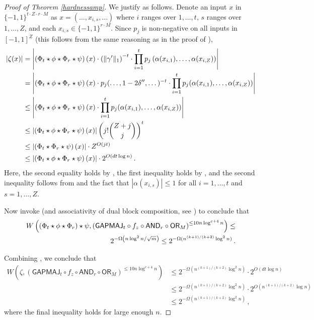 \documentclass{toc}
\newcommand{\OR}{\mathsf{ OR}}
\newcommand{\GAPMAJ}{\mathsf{GAPMAJ}}
\newcommand{\bits}{\{-1,1\}}
\newcommand{\ls}{\star}
\newcommand{\AND}{\mathsf{AND}}
\begin{document}
\begin{proof}[Proof of Theorem \ref{hardnessamp}]
	We justify  as follows. Denote
	an input $x$ in $\bits^{t \cdot Z \cdot r \cdot M}$ as $x=(\dots, x_{i, s}, \dots)$ 
	where $i$ ranges over $1, \dots, t$, $s$ ranges over $1, \dots, Z$,
	and each $x_{i,s} \in \bits^{r \cdot M}$.  Since $p_j$ is non-negative on all inputs in $[-1, 1]^Z$ (this follows from the same reasoning as in the proof of ),
	\begin{align}
	\left|\zeta(x)\right| &= \left|\left(\Phi_t \ls \phi \ls \Phi_r \ls \psi\right)(x) \cdot \left(\|\gamma'\|_1\right)^{-t}  \cdot \prod_{i=1}^{t} p_j\left(\alpha(x_{i, 1}), \dots, \alpha(x_{i, Z})\right) \right| \notag \\
	\notag &=  \left|\left(\Phi_t \ls \phi \ls \Phi_r \ls \psi\right)(x) \cdot p_j(\dots, 1-2\delta'', \dots)^{-t} \cdot \prod_{i=1}^{t} p_j(\alpha(x_{i, 1}), \dots, \alpha(x_{i, Z}))\right|\\
	\notag &\leq  \left|\left(\Phi_t \ls \phi \ls \Phi_r \ls \psi\right)(x) \cdot \prod_{i=1}^{t} p_j(\alpha(x_{i, 1}), \dots, \alpha(x_{i, Z}))\right|\\
	&\leq \left| \left(\Phi_t \ls \phi \ls \Phi_r \ls \psi\right)(x) \right| \left(j! {Z+j \choose j}\right)^t \notag \\
	&\leq \left| \left(\Phi_t \ls \Phi_r \ls \psi\right)(x) \right| \cdot Z^{O(jt)} \notag\\
	&\leq 
	\left| \left(\Phi_t \ls \phi \ls \Phi_r \ls \psi\right)(x) \right| \cdot 2^{O(d t \log n)}\,. \label{fineq} 
	\end{align}
	Here, the second equality holds by , the first inequality holds by , and the second inequality follows from  and the fact that $|\alpha(x_{i, s})| \leq 1$ for all $i=1, \dots, t$ and $s=1, \dots, Z$. 
	
	Now invoke  (and associativity of dual block composition, see 
	 ) to conclude that 
	\begin{align} \label{reallyfineq} W\left( \left(\Phi_t \ls \phi \ls \Phi_r\right) \ls \psi, \left(\GAPMAJ_t \circ f_z \circ \AND_r \circ \OR_M\right)^{\leq 10 n \log^{c+4} n}\right) \notag \leq\\
	2^{-\Omega\left(n \log^2 n / \sqrt{m}\right)} \leq 2^{-\Omega(n^{(k+1)/(k+2)} \log^2 n)}\,.\end{align}
	
	Combining  , we conclude that
	\begin{align*} W\left( \zeta, \left(\GAPMAJ_t \circ f_z \circ \AND_r \circ \OR_M\right)^{\leq 10 n \log^{c+4} n}\right) &
	\leq 2^{-\Omega\left(n^{(k+1)/(k+2)} \log^2 n\right)} \cdot 2^{O\left(d t \log n\right)} \\
	&\leq 2^{-\Omega\left(n^{(k+1)/(k+2)} \log^2 n\right)} \cdot 2^{O\left(n^{(k+1)/(k+2)} \log n\right)}\\
	&\leq 2^{-\Omega\left(n^{(k+1)/(k+2)} \log^2 n\right)}\,,
	\end{align*}
	where the final inequality holds for large enough $n$. 
	

\end{proof}
\end{document}
